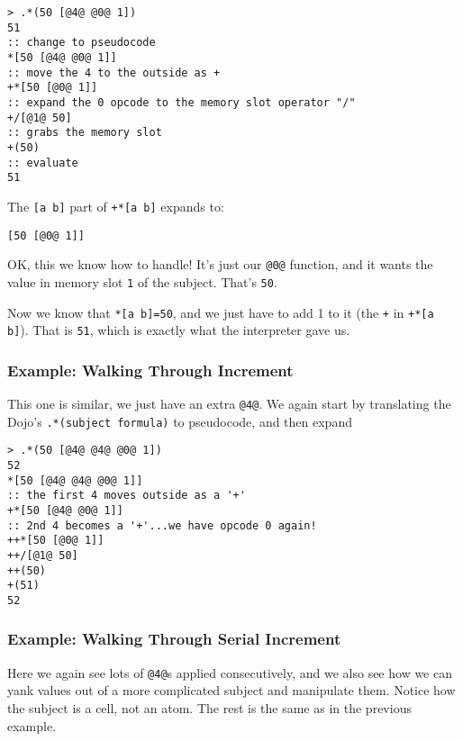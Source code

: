 \documentclass[twoside]{article}
\begin{document}
\begin{lstlisting}[style=listingblock]
> .*(50 [@4@ @0@ 1])
51
:: change to pseudocode
*[50 [@4@ @0@ 1]]
:: move the 4 to the outside as +
+*[50 [@0@ 1]]
:: expand the 0 opcode to the memory slot operator "/"
+/[@1@ 50]
:: grabs the memory slot
+(50)
:: evaluate
51
\end{lstlisting}

\noindent
The \lstinline[style=inlinecode]{[a b]} part of \lstinline[style=inlinecode]{+*[a b]} expands to:

\begin{lstlisting}[style=listingblock]
[50 [@0@ 1]]
\end{lstlisting}

\noindent
OK, this we know how to handle! It's just our \lstinline[style=inlinecode]{@0@} function, and it wants the value in memory slot \lstinline[style=inlinecode]{1} of the subject. That's \lstinline[style=inlinecode]{50}.

Now we know that \lstinline[style=inlinecode]{*[a b]=50}, and we just have to add 1 to it (the \lstinline[style=inlinecode]{+} in \lstinline[style=inlinecode]{+*[a b]}). That is \lstinline[style=inlinecode]{51}, which is exactly what the interpreter gave us.

\subsubsection{Example:  Walking Through Increment}

This one is similar, we just have an extra \lstinline[style=inlinecode]{@4@}. We again start by translating the Dojo's \lstinline[style=inlinecode]{.*(subject formula)} to pseudocode, and then expand

\begin{lstlisting}[style=listingblock]
> .*(50 [@4@ @4@ @0@ 1])
52
*[50 [@4@ @4@ @0@ 1]]
:: the first 4 moves outside as a '+'
+*[50 [@4@ @0@ 1]]
:: 2nd 4 becomes a '+'...we have opcode 0 again!
++*[50 [@0@ 1]]
++/[@1@ 50]
++(50)
+(51)
52
\end{lstlisting}

\subsubsection{Example:  Walking Through Serial Increment}

Here we again see lots of \lstinline[style=inlinecode]{@4@}s applied consecutively, and we also see how we can yank values out of a more complicated subject and manipulate them. Notice how the subject is a cell, not an atom. The rest is the same as in the previous example.
\end{document}
